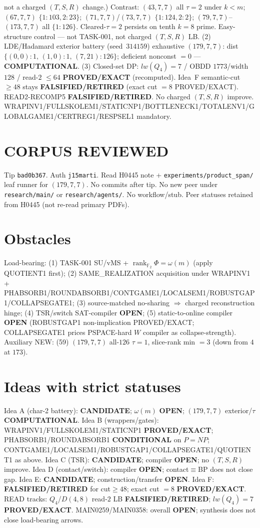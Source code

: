\documentclass[11pt]{article}
\begin{document}
not a charged $(T,S,R)$ change.)
Contrast: $(43,7,7)$ all $\tau{=}2$ under $k{<}m$; $(67,7,7)$ $\{1{:}103,2{:}23\}$;
$(71,7,7)$/$(73,7,7)$ $\{1{:}124,2{:}2\}$; $(79,7,7)$--$(173,7,7)$ all $\{1{:}126\}$.
Cleared-$\tau{=}2$ persists on tenth $k{=}8$ prime. Easy-structure control --- not TASK-001,
not charged $(T,S,R)$ LB.
(2) LDE/Hadamard exterior battery (seed~$314159$) exhaustive $(179,7,7)$:
dist $\{(0,0){:}1,\,(1,0){:}1,\,(7,21){:}126\}$; deficient nonconst $=0$ --- \textbf{COMPUTATIONAL}.
(3) Closed-set DP: $lw(Q_4)=7$ / OBDD $1773$/width $128$ / read-$2$ $\le64$
\textbf{PROVED/EXACT} (recomputed).
Idea~F semantic-cut $\ge48$ stays \textbf{FALSIFIED/RETIRED} (exact cut $=8$ PROVED/EXACT).
READ2-RECOMP5 \textbf{FALSIFIED/RETIRED}. No charged $(T,S,R)$ improve.
WRAPINV1/FULLSKOLEM1/STATICNP1/BOTTLENECK1/TOTALENV1/GLOBALGAME1/CERTREG1/RESPSEL1 mandatory.

\section*{CORPUS REVIEWED}
Tip \texttt{bad0b367}. Auth \texttt{j15marti}. Read H0445 note +
\texttt{experiments/product\_span/} leaf runner for $(179,7,7)$.
No commits after tip. No new peer under \texttt{research/main/} or \texttt{research/agents/}.
No workflow/stub. Peer statuses retained from H0445 (not re-read primary PDFs).

\section*{Obstacles}
Load-bearing: (1) TASK-001 SU/vMS + $\operatorname{rank}_{\mathbb F_2}\Phi=\omega(m)$ (apply QUOTIENT1 first);
(2) SAME\_REALIZATION acquisition under WRAPINV1 + PHABSORB1/ROUNDABSORB1/CONTGAME1/LOCALSEM1/ROBUSTGAP1/COLLAPSEGATE1;
(3) source-matched no-sharing $\Rightarrow$ charged reconstruction hinge;
(4) TSR/switch SAT-compiler \textbf{OPEN};
(5) static-to-online compiler \textbf{OPEN} (ROBUSTGAP1 non-implication PROVED/EXACT;
COLLAPSEGATE1 prices PSPACE-hard $W$ compiler as collapse-strength).
Auxiliary NEW: (59) $(179,7,7)$ all-$126$ $\tau{=}1$, slice-rank min $=3$ (down from $4$ at $173$).

\section*{Ideas with strict statuses}
Idea A (char-2 battery): \textbf{CANDIDATE}; $\omega(m)$ \textbf{OPEN}; $(179,7,7)$ exterior/$\tau$ \textbf{COMPUTATIONAL}.
Idea B (wrappers/gates): WRAPINV1/FULLSKOLEM1/STATICNP1 \textbf{PROVED/EXACT};
PHABSORB1/ROUNDABSORB1 \textbf{CONDITIONAL} on $P=NP$;
CONTGAME1/LOCALSEM1/ROBUSTGAP1/COLLAPSEGATE1/QUOTIENT1 as above.
Idea C (TSR): \textbf{CANDIDATE}; compiler \textbf{OPEN}; no $(T,S,R)$ improve.
Idea D (contact/switch): compiler \textbf{OPEN}; contact$\equiv$BP does not close gap.
Idea E: \textbf{CANDIDATE}; construction/transfer \textbf{OPEN}.
Idea F: \textbf{FALSIFIED/RETIRED} for cut$\ge48$; exact cut $=8$ \textbf{PROVED/EXACT}.
READ tracks: $Q_4$/$D(4,8)$ read-$2$ LB \textbf{FALSIFIED/RETIRED}; $lw(Q_4)=7$ \textbf{PROVED/EXACT}.
MAIN0259/MAIN0358: overall \textbf{OPEN}; synthesis does not close load-bearing arrows.
\end{document}
